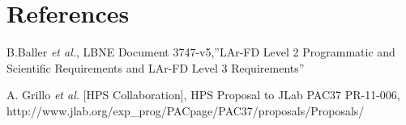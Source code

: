 \section{References}

\begin{thebibliography}{99}

 B.Baller {\it et al.}, LBNE Document 3747-v5,''LAr-FD Level 2 Programmatic and
Scientific Requirements and LAr-FD Level 3 Requirements''

 A. Grillo {\it et al.} [HPS Collaboration], HPS Proposal to JLab PAC37 PR-11-006,
 http://www.jlab.org/exp\_prog/PACpage/PAC37/proposals/Proposals/
	               
\end{thebibliography} 